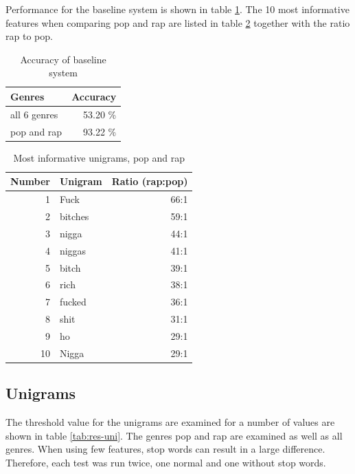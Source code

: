\documentclass[a4paper, 12pt]{article}
\begin{document}
Performance for the baseline system is shown in table \ref{tab:res-baseline}.
The 10 most informative features when comparing pop and rap are listed in table \ref{tab:num-feat} together with the ratio rap to pop.

\begin{table}[h]
\begin{center}
    \begin{tabular}{| l | r |}
        \hline
        Genres & Accuracy \\
        \hline
        all 6 genres & 53.20 \% \\
        pop and rap & 93.22 \% \\
        \hline
    \end{tabular}
    \caption{Accuracy of baseline system}
    \label{tab:res-baseline}
\end{center}
\end{table}


\begin{table}[h]
\begin{center}
    \begin{tabular}{| r | l | r |}
        \hline
        Number  & Unigram   & Ratio (rap:pop)   \\ \hline
        1       & Fuck      & 66:1              \\ \hline
        2       & bitches   & 59:1              \\ \hline
        3       & nigga     & 44:1              \\ \hline
        4       & niggas    & 41:1              \\ \hline
        5       & bitch     & 39:1              \\ \hline
        6       & rich      & 38:1              \\ \hline
        7       & fucked    & 36:1              \\ \hline
        8       & shit      & 31:1              \\ \hline
        9       & ho        & 29:1              \\ \hline
        10      & Nigga     & 29:1              \\ \hline
    \end{tabular}
    \caption{Most informative unigrams, pop and rap}
    \label{tab:num-feat}
\end{center}
\end{table}

\subsection{Unigrams}
\label{sec:unigrams}
The threshold value for the unigrams are examined for a number of values are shown in table \ref{tab:res-uni}.
The genres pop and rap are examined as well as all genres.
When using few features, stop words can result in a large difference. Therefore, each test was run twice, one normal and one without stop words.
\end{document}
